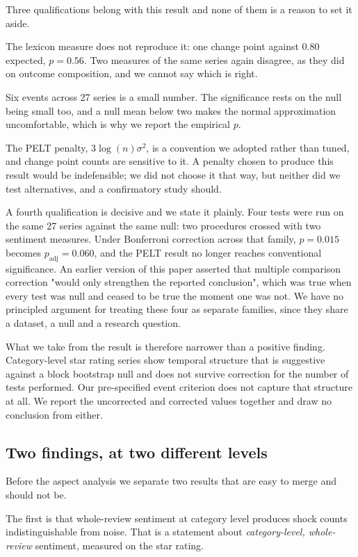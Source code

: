 \documentclass[11pt,a4paper]{article}
\makeatletter
\let\original@subsection\subsection
\renewcommand{\subsection}{\FloatBarrier\original@subsection}%
\makeatother
\begin{document}
Three qualifications belong with this result and none of them is a reason to
set it aside.

The lexicon measure does not reproduce it: one change point against 0.80
expected, $p = 0.56$. Two measures of the same series again disagree, as they
did on outcome composition, and we cannot say which is right.

Six events across 27 series is a small number. The significance rests on the
null being small too, and a null mean below two makes the normal approximation
uncomfortable, which is why we report the empirical $p$.

The PELT penalty, $3\log(n)\sigma^2$, is a convention we adopted rather than
tuned, and change point counts are sensitive to it. A penalty chosen to produce
this result would be indefensible; we did not choose it that way, but neither
did we test alternatives, and a confirmatory study should.

A fourth qualification is decisive and we state it plainly. Four tests were run
on the same 27 series against the same null: two procedures crossed with two
sentiment measures. Under Bonferroni correction across that family,
$p = 0.015$ becomes $p_{\mathrm{adj}} = 0.060$, and the PELT result no longer
reaches conventional significance. An earlier version of this paper asserted
that multiple comparison correction "would only strengthen the reported
conclusion", which was true when every test was null and ceased to be true the
moment one was not. We have no principled argument for treating these four as
separate families, since they share a dataset, a null and a research question.

What we take from the result is therefore narrower than a positive finding.
Category-level star rating series show temporal structure that is suggestive
against a block bootstrap null and does not survive correction for the number
of tests performed. Our pre-specified event criterion does not capture that
structure at all. We report the uncorrected and corrected values together and
draw no conclusion from either.

\subsection{Two findings, at two different levels}
\label{sec:twolevels}

Before the aspect analysis we separate two results that are easy to merge and
should not be.

The first is that whole-review sentiment at category level produces shock
counts indistinguishable from noise. That is a statement about
\emph{category-level, whole-review} sentiment, measured on the star rating.
\end{document}
